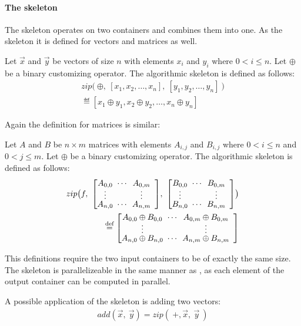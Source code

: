 \paragraph{The \zip skeleton}
The \zip skeleton operates on two containers and combines them into one.
As the \map skeleton it is defined for vectors and matrices as well.
\begin{definition}
  \label{definition:zip}
  Let $\vec{x}$ and $\vec{y}$ be vectors of size $n$ with elements $x_i$ and $y_i$ where $0 < i \leq n$.
  Let $\oplus$ be a binary customizing operator.
  The algorithmic skeleton \zip is defined as follows:
  \begin{equation*}
    \begin{split}
    zip \big(\ \oplus,\ [x_1, x_2, \dots, x_n],\ [y_1, y_2, \dots, y_n]\ \big)\\
      \eqdef [x_1 \oplus y_1, x_2 \oplus y_2, \dots, x_n \oplus y_n]
    \end{split}
  \end{equation*}
\end{definition}
\noindent
Again the definition for matrices is similar:
\begin{definition}
  \label{definition:zip:matrix}
  Let $A$ and $B$ be $n\times m$ matrices with elements $A_{i,j}$ and $B_{i,j}$ where $0 < i \leq n$ and $0 < j \leq m$.
  Let $\oplus$ be a binary customizing operator.
  The algorithmic skeleton \zip is defined as follows:
  \begin{equation*}
    \begin{split}
    zip\big( f,\ {\DottedMatrix{A_{0,0}}{A_{0,m}}{A_{n,0}}{A_{n,m}}},\
                 {\DottedMatrix{B_{0,0}}{B_{0,m}}{B_{n,0}}{B_{n,m}}}\big) \\
      \eqdef \DottedMatrix{A_{0,0} \oplus B_{0,0}}{A_{0,m} \oplus B_{0,m}}{A_{n,0} \oplus B_{n,0}}{A_{n,m} \oplus B_{n,m}}
    \end{split}
  \end{equation*}
\end{definition}
\noindent
This definitions require the two input containers to be of exactly the same size.
The \zip skeleton is parallelizeable in the same manner as \map, as each element of the output container can be computed in parallel.

A possible application of the \zip skeleton is adding two vectors:
\begin{align*}
  add(\vec{x},\ \vec{y}) = zip(\ +, \vec{x},\ \vec{y}\ )
\end{align*}



